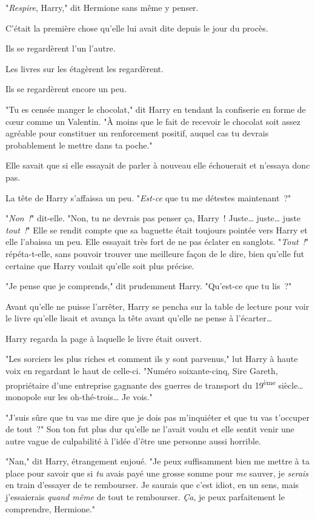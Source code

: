 "\emph{Respire}, Harry," dit Hermione sans même y penser.

C'était la première chose qu'elle lui avait dite depuis le jour du procès.

Ils se regardèrent l'un l'autre.

Les livres sur les étagèrent les regardèrent.

Ils se regardèrent encore un peu.

"Tu es censée manger le chocolat," dit Harry en tendant la confiserie en forme de cœur comme un Valentin. "À moins que le fait de recevoir le chocolat soit assez agréable pour constituer un renforcement positif, auquel cas tu devrais probablement le mettre dans ta poche."

Elle savait que si elle essayait de parler à nouveau elle échouerait et n'essaya donc pas.

La tête de Harry s'affaissa un peu. "\emph{Est-ce} que tu me détestes maintenant~?"

"\emph{Non~!}" dit-elle. "Non, tu ne devrais pas penser ça, Harry~! Juste… juste… juste \emph{tout~!}" Elle se rendit compte que sa baguette était toujours pointée vers Harry et elle l'abaissa un peu. Elle essayait très fort de ne pas éclater en sanglots. "\emph{Tout~!}" répéta-t-elle, sans pouvoir trouver une meilleure façon de le dire, bien qu'elle fut certaine que Harry voulait qu'elle soit plus précise.

"Je pense que je comprends," dit prudemment Harry. "Qu'est-ce que tu lis~?"

Avant qu'elle ne puisse l'arrêter, Harry se pencha sur la table de lecture pour voir le livre qu'elle lisait et avança la tête avant qu'elle ne pense à l'écarter…

Harry regarda la page à laquelle le livre était ouvert.

"Les sorciers les plus riches et comment ils y sont parvenus," lut Harry à haute voix en regardant le haut de celle-ci. "Numéro soixante-cinq, Sire Gareth, propriétaire d'une entreprise gagnante des guerres de transport du 19\textsuperscript{ème} siècle… monopole sur les oh-thé-trois… Je vois."

"J'suis sûre que tu vas me dire que je dois pas m'inquiéter et que tu vas t'occuper de tout~?" Son ton fut plus dur qu'elle ne l'avait voulu et elle sentit venir une autre vague de culpabilité à l'idée d'être une personne aussi horrible.

"Nan," dit Harry, étrangement enjoué. "Je peux suffisamment bien me mettre à ta place pour savoir que si \emph{tu} avais payé une grosse somme pour \emph{me} sauver, je \emph{serais} en train d'essayer de te rembourser. Je saurais que c'est idiot, en un sens, mais j'essaierais \emph{quand même} de tout te rembourser. \emph{Ça}, je peux parfaitement le comprendre, Hermione."

